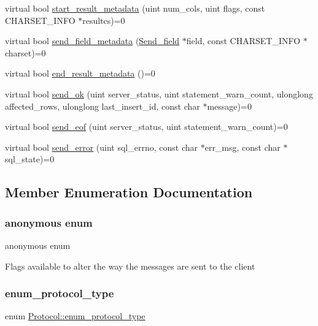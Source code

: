\begin{DoxyCompactItemize}
virtual bool \mbox{\hyperlink{classProtocol_aa815f52ff0474421cd5db5ea5da84a85}{start\+\_\+result\+\_\+metadata}} (uint num\+\_\+cols, uint flags, const C\+H\+A\+R\+S\+E\+T\+\_\+\+I\+N\+FO $\ast$resultcs)=0
\item 
virtual bool \mbox{\hyperlink{classProtocol_ab1c4f70c198fa10fbf4aed0dfc2c4847}{send\+\_\+field\+\_\+metadata}} (\mbox{\hyperlink{classSend__field}{Send\+\_\+field}} $\ast$field, const C\+H\+A\+R\+S\+E\+T\+\_\+\+I\+N\+FO $\ast$charset)=0
\item 
virtual bool \mbox{\hyperlink{classProtocol_a48bb540f0317bf418c129f441f2e82b9}{end\+\_\+result\+\_\+metadata}} ()=0
\item 
virtual bool \mbox{\hyperlink{classProtocol_a5af2742550f44725128e121eb647eb34}{send\+\_\+ok}} (uint server\+\_\+status, uint statement\+\_\+warn\+\_\+count, ulonglong affected\+\_\+rows, ulonglong last\+\_\+insert\+\_\+id, const char $\ast$message)=0
\item 
virtual bool \mbox{\hyperlink{classProtocol_a9a2cc208a15a3a81f99ace4c1009c01d}{send\+\_\+eof}} (uint server\+\_\+status, uint statement\+\_\+warn\+\_\+count)=0
\item 
virtual bool \mbox{\hyperlink{classProtocol_a7718f78528dde01063f4da3d074909e2}{send\+\_\+error}} (uint sql\+\_\+errno, const char $\ast$err\+\_\+msg, const char $\ast$sql\+\_\+state)=0
\end{DoxyCompactItemize}


\subsection{Member Enumeration Documentation}
\mbox{\label{classProtocol_acd8b08258a48b752a3943389fc923302}} 
\subsubsection{\texorpdfstring{anonymous enum}{anonymous enum}}
{\footnotesize\ttfamily anonymous enum}

Flags available to alter the way the messages are sent to the client \mbox{\label{classProtocol_ab1d147a8122f4ea4f8516ee23c514b02}} 
\subsubsection{\texorpdfstring{enum\+\_\+protocol\+\_\+type}{enum\_protocol\_type}}
{\footnotesize\ttfamily enum \mbox{\hyperlink{classProtocol_ab1d147a8122f4ea4f8516ee23c514b02}{Protocol\+::enum\+\_\+protocol\+\_\+type}}}

